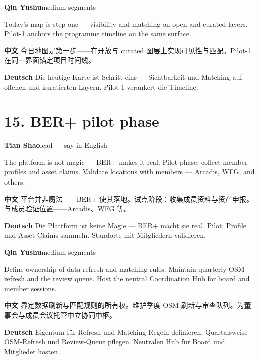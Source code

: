 \documentclass[11pt,a4paper]{ctexart}
\newenvironment{speakerblock}[2]{%
  \par\medskip
  {\color{berblue}\textbf{#1}}\hfill{\small\textcolor{bergrey}{#2}}\par
  \vspace{0.25em}
}{\par\medskip}
\begin{document}
\begin{speakerblock}{Qin Yushu}{medium segments}
\begin{englishbox}
Today's map is step one — visibility and matching on open and curated layers. Pilot-1 anchors the programme timeline on the same surface.
\end{englishbox}

\textbf{中文} 今日地图是第一步——在开放与 curated 图层上实现可见性与匹配。Pilot-1 在同一界面锚定项目时间线。

\textbf{Deutsch} Die heutige Karte ist Schritt eins — Sichtbarkeit und Matching auf offenen und kuratierten Layern. Pilot-1 verankert die Timeline.
\end{speakerblock}



\section{15. BER+ pilot phase}

\begin{speakerblock}{Tian Shao}{lead — say in English}
\begin{englishbox}
The platform is not magic — BER+ makes it real. Pilot phase: collect member profiles and asset claims. Validate locations with members — Arcadis, WFG, and others.
\end{englishbox}

\textbf{中文} 平台并非魔法——BER+ 使其落地。试点阶段：收集成员资料与资产申报。与成员验证位置——Arcadis、WFG 等。

\textbf{Deutsch} Die Plattform ist keine Magie — BER+ macht sie real. Pilot: Profile und Asset-Claims sammeln. Standorte mit Mitgliedern validieren.
\end{speakerblock}


\begin{speakerblock}{Qin Yushu}{medium segments}
\begin{englishbox}
Define ownership of data refresh and matching rules. Maintain quarterly OSM refresh and the review queue. Host the neutral Coordination Hub for board and member sessions.
\end{englishbox}

\textbf{中文} 界定数据刷新与匹配规则的所有权。维护季度 OSM 刷新与审查队列。为董事会与成员会议托管中立协同中枢。

\textbf{Deutsch} Eigentum für Refresh und Matching-Regeln definieren. Quartalsweise OSM-Refresh und Review-Queue pflegen. Neutralen Hub für Board und Mitglieder hosten.
\end{speakerblock}
\end{document}
